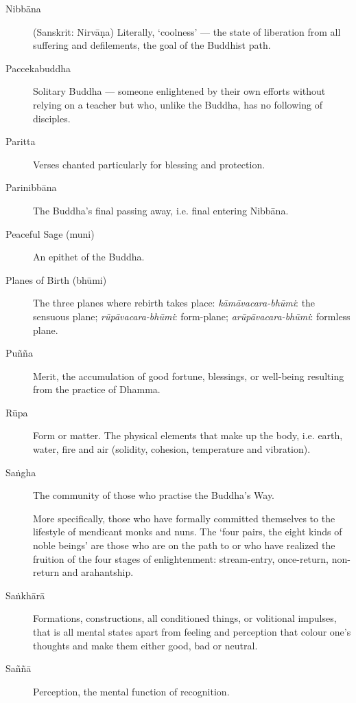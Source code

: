 \begin{description}
\item[Nibbāna] (Sanskrit: Nirvāṇa) Literally, ‘coolness’ --- the state of
  liberation from all suffering and defilements, the goal of the
  Buddhist path.

\item[Paccekabuddha] Solitary Buddha --- someone enlightened by their own
  efforts without relying on a teacher but who, unlike the Buddha, has
  no following of disciples.

\item[Paritta] Verses chanted particularly for blessing and protection.

\item[Parinibbāna] The Buddha’s final passing away, i.e. final entering
  Nibbāna.

\item[Peaceful Sage (muni)] An epithet of the Buddha.

\item[Planes of Birth (bhūmi)] The three planes where rebirth takes
  place: \emph{kāmāvacara-bhūmi}: the sensuous plane;
  \emph{rūpāvacara-bhūmi}: form-plane; \emph{arūpāvacara-bhūmi}: formless
  plane.

\item[Puñña] Merit, the accumulation of good fortune, blessings, or
  well-being resulting from the practice of Dhamma.

\item[Rūpa] Form or matter. The physical elements that make up the body,
  i.e. earth, water, fire and air (solidity, cohesion, temperature and
  vibration).

\item[Saṅgha] The community of those who practise the Buddha’s Way.

  More specifically, those who have formally committed themselves to the
lifestyle of mendicant monks and nuns. The `four pairs, the eight kinds of
noble beings' are those who are on the path to or who have realized the
fruition of the four stages of enlightenment: stream-entry, once-return,
non-return and arahantship.

\item[Saṅkhārā] Formations, constructions, all conditioned things, or volitional
  impulses, that is all mental states apart from feeling and perception
  that colour one’s thoughts and make them either good, bad or neutral.

\item[Saññā] Perception, the mental function of recognition.


\end{description}
